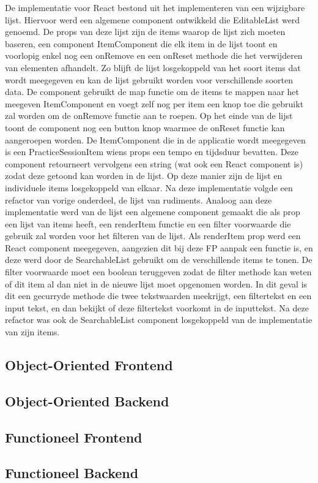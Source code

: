  De implementatie voor React bestond uit het implementeren van een wijzigbare lijst. Hiervoor werd een algemene component ontwikkeld die EditableList werd genoemd. De props van deze lijst zijn de items waarop de lijst zich moeten baseren, een component ItemComponent die elk item in de lijst toont en voorlopig enkel nog een onRemove en een onReset methode die het verwijderen van elementen afhandelt. Zo blijft de lijst losgekoppeld van het soort items dat wordt meegegeven en kan de lijst gebruikt worden voor verschillende soorten data. De component gebruikt de map functie om de items te mappen naar het meegeven ItemComponent en voegt zelf nog per item een knop toe die gebruikt zal worden om de onRemove functie aan te roepen. Op het einde van de lijst toont de component nog een button knop waarmee de onReset functie kan aangeroepen worden. De ItemComponent die in de applicatie wordt meegegeven is een PracticeSessionItem wiens props een tempo en tijdsduur bevatten. Deze component retourneert vervolgens een string (wat ook een React component is) zodat deze getoond kan worden in de lijst. Op deze manier zijn de lijst en individuele items losgekoppeld van elkaar. Na deze implementatie volgde een refactor van vorige onderdeel, de lijst van rudiments. Analoog aan deze implementatie werd van de lijst een algemene component gemaakt die als prop een lijst van items heeft, een renderItem functie en een filter voorwaarde die gebruik zal worden voor het filteren van de lijst. Als renderItem prop werd een React component meegegeven, aangezien dit bij deze FP aanpak een functie is, en deze werd door de SearchableList gebruikt om de verschillende items te tonen. De filter voorwaarde moet een boolean teruggeven zodat de filter methode kan weten of dit item al dan niet in de nieuwe lijst moet opgenomen worden. In dit geval is dit een gecurryde methode die twee tekstwaarden meekrijgt, een filtertekst en een input tekst, en dan bekijkt of deze filtertekst voorkomt in de inputtekst. Na deze refactor was ook de SearchableList component losgekoppeld van de implementatie van zijn items.  

\subsection{Object-Oriented Frontend}
\subsection{Object-Oriented Backend}
\subsection{Functioneel Frontend}
\subsection{Functioneel Backend}